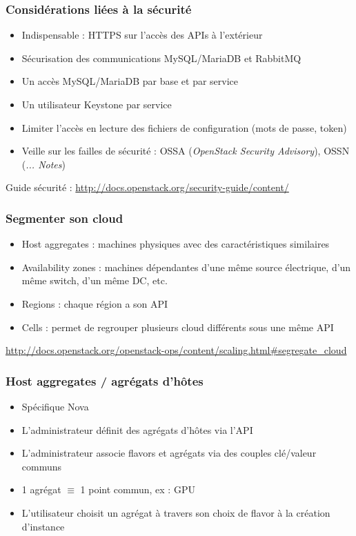   \begin{frame}
    \frametitle{Considérations liées à la sécurité}
    \begin{itemize}
      \item Indispensable : HTTPS sur l'accès des APIs à l'extérieur
      \item Sécurisation des communications MySQL/MariaDB et RabbitMQ
      \item Un accès MySQL/MariaDB par base et par service
      \item Un utilisateur Keystone par service
      \item Limiter l'accès en lecture des fichiers de configuration (mots de passe, token)
      \item Veille sur les failles de sécurité : OSSA (\textit{OpenStack Security Advisory}), OSSN (\textit{... Notes})
    \end{itemize}
    Guide sécurité : \url{http://docs.openstack.org/security-guide/content/}
  \end{frame}

  \begin{frame}
    \frametitle{Segmenter son cloud}
    \begin{itemize}
      \item Host aggregates : machines physiques avec des caractéristiques similaires
      \item Availability zones : machines dépendantes d'une même source électrique, d'un même switch, d'un même DC, etc.
      \item Regions : chaque région a son API
      \item Cells : permet de regrouper plusieurs cloud différents sous une même API
    \end{itemize}
    \url{http://docs.openstack.org/openstack-ops/content/scaling.html\#segregate\_cloud}
  \end{frame}

  \begin{frame}
    \frametitle{Host aggregates / agrégats d'hôtes}
    \begin{itemize}
      \item Spécifique Nova
      \item L'administrateur définit des agrégats d'hôtes via l'API
      \item L'administrateur associe flavors et agrégats via des couples clé/valeur communs
      \item 1 agrégat $\equiv$ 1 point commun, ex : GPU
      \item L'utilisateur choisit un agrégat à travers son choix de flavor à la création d'instance
    \end{itemize}
  \end{frame}

